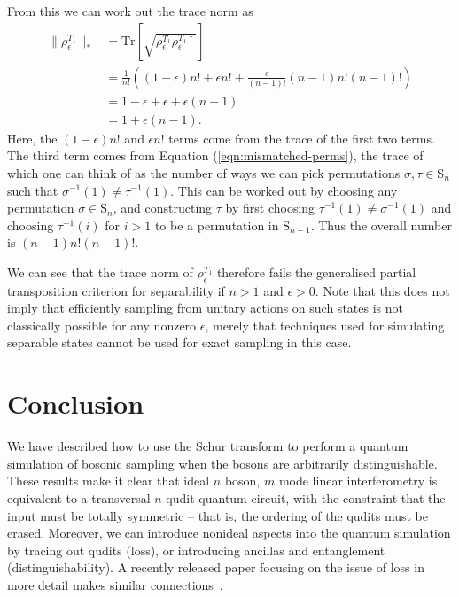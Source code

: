 From this we can work out the trace norm as
\begin{align}
\|\rho_{\epsilon}^{T_1}\|_*
 &= \textrm{Tr}\left[\sqrt{\rho_\epsilon^{T_1}\rho_\epsilon^{T_1\dagger}}\right]\\
 &= \frac{1}{n!}\left((1-\epsilon)n! + \epsilon n! + \frac{\epsilon}{(n-1)!}(n-1)n!(n-1)!\right)\\
 &= 1-\epsilon + \epsilon+\epsilon(n-1)\\
 &= 1+\epsilon(n-1).
\end{align}
Here, the $(1-\epsilon)n!$ and $\epsilon n!$ terms come from the trace of the first two terms. 
The third term comes from Equation (\ref{eqn:mismatched-perms}), the trace of which one can think of as the number of ways we can pick permutations $\sigma,\tau\in\textrm{S}_n$ such that $\sigma^{-1}(1)\neq\tau^{-1}(1)$. 
This can be worked out by choosing any permutation $\sigma \in \textrm{S}_n$, and constructing $\tau$ by first choosing $\tau^{-1}(1)\neq\sigma^{-1}(1)$ and choosing $\tau^{-1}(i)$ for $i>1$ to be a permutation in $\textrm{S}_{n-1}$. 
Thus the overall number is $(n-1)n!(n-1)!$.

We can see that the trace norm of $\rho_\epsilon^{T_1}$ therefore fails the generalised partial transposition criterion for separability if $n>1$ and $\epsilon>0$.
Note that this does not imply that efficiently sampling from unitary actions on such states is not classically possible for any nonzero $\epsilon$, merely that techniques used for simulating separable states cannot be used for exact sampling in this case.



\section{Conclusion}
\label{sec:nc-conclusion}

We have described how to use the Schur transform to perform a quantum simulation of bosonic sampling when the bosons are arbitrarily distinguishable.
These results make it clear that ideal $n$ boson, $m$ mode linear interferometry is equivalent to a transversal $n$ qudit quantum circuit, with the constraint that the input must be totally symmetric -- that is, the ordering of the qudits must be erased.
Moreover, we can introduce nonideal aspects into the quantum simulation by tracing out qudits (loss), or introducing ancillas and entanglement (distinguishability).
A recently released paper focusing on the issue of loss in more detail makes similar connections~\cite{oszmaniec2018}.

